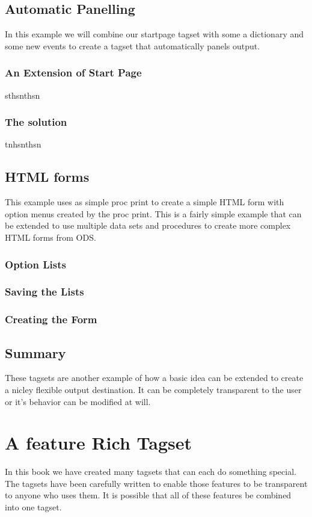 \section{Automatic Panelling}
In this example we will combine our startpage tagset with some a dictionary 
and some new events to create a tagset that automatically panels output.

\subsection{An Extension of Start Page}
sthsnthsn

\subsection{The solution}
tnhsnthsn

\section{HTML forms}
This example uses as simple proc print to create a simple HTML form with 
option menus created by the proc print.  This is a fairly simple example 
that can be extended to use multiple data sets and procedures to create
more complex HTML forms from ODS.

\subsection{Option Lists}

\subsection{Saving the Lists}

\subsection{Creating the Form}

\section{Summary}
These tagsets are another example of how a basic idea can be
extended to create a nicley flexible output destination.  It can be completely
transparent to the user or it's behavior can be modified at will.


\chapter{A feature Rich Tagset}
In this book we have created many tagsets that can each do something special.
The tagsets have been carefully written to enable those features to be
transparent to anyone who uses them.  It is possible that all of these features
be combined into one tagset.  

